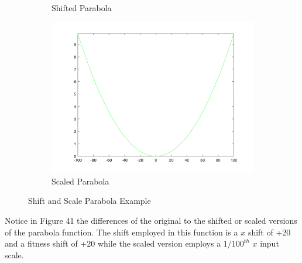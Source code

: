 \begin{figure}
\begin{subfigure}[b]{0.6\textwidth}
    \caption{Shifted Parabola}
  \end{subfigure}
  \begin{subfigure}[b]{0.6\textwidth}
    \includegraphics[width=\textwidth]{img/translates/parabola/loa-graph-scale}
    \caption{Scaled Parabola}
  \end{subfigure}
  \caption{Shift and Scale Parabola Example}
\end{figure}

\par Notice in Figure 41 the differences of the original to the shifted or scaled versions of the parabola function. The shift employed in this function is a $x$ shift of +20 and a fitness shift of +20 while the scaled version employs a $1/100^{th}$ $x$ input scale.

